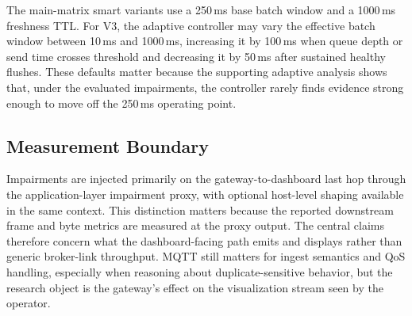 The main-matrix smart variants use a 250\,ms base batch window and a 1000\,ms freshness TTL. For V3, the adaptive controller may vary the effective batch window between 10\,ms and 1000\,ms, increasing it by 100\,ms when queue depth or send time crosses threshold and decreasing it by 50\,ms after sustained healthy flushes. These defaults matter because the supporting adaptive analysis shows that, under the evaluated impairments, the controller rarely finds evidence strong enough to move off the 250\,ms operating point.

\subsection{Measurement Boundary}

Impairments are injected primarily on the gateway-to-dashboard last hop through the application-layer impairment proxy, with optional host-level shaping available in the same context. This distinction matters because the reported downstream frame and byte metrics are measured at the proxy output. The central claims therefore concern what the dashboard-facing path emits and displays rather than generic broker-link throughput. MQTT still matters for ingest semantics and QoS handling, especially when reasoning about duplicate-sensitive behavior, but the research object is the gateway's effect on the visualization stream seen by the operator.
